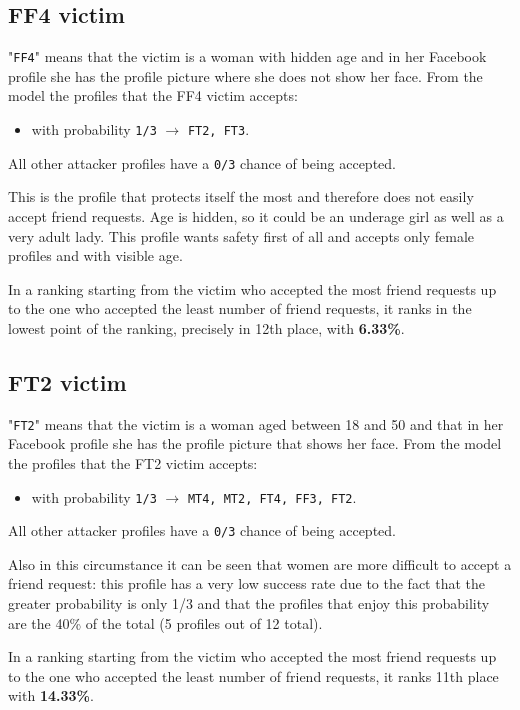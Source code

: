 \subsection*{FF4 victim}
"\texttt{FF4}" means that the victim is a woman with hidden age and in her Facebook profile she has the profile picture where she does not show her face.
From the model the profiles that the FF4 victim accepts:
\begin{itemize}
	\item with probability \texttt{1/3} $\rightarrow$ \texttt{FT2, FT3}.
\end{itemize}  
All other attacker profiles have a \texttt{0/3} chance of being accepted.
\par \noindent This is the profile that protects itself the most and therefore does not easily accept friend requests. Age is hidden, so it could be an underage girl as well as a very adult lady. This profile wants safety first of all and accepts only female profiles and with visible age.
\par \noindent In a ranking starting from the victim who accepted the most friend requests up to the one who accepted the least number of friend requests, it ranks in the lowest point of the ranking, precisely in 12th place, with \textbf{6.33\%}.


\subsection*{FT2 victim}
"\texttt{FT2}" means that the victim is a woman aged between 18 and 50 and that in her Facebook profile she has the profile picture that shows her face.
From the model the profiles that the FT2 victim accepts:
\begin{itemize}
	\item with probability \texttt{1/3} $\rightarrow$ \texttt{MT4, MT2, FT4, FF3, FT2}.
\end{itemize}  
All other attacker profiles have a \texttt{0/3} chance of being accepted.
\par \noindent Also in this circumstance it can be seen that women are more difficult to accept a friend request: this profile has a very low success rate due to the fact that the greater probability is only 1/3 and that the profiles that enjoy this probability are the 40\% of the total (5 profiles out of 12 total).
\par \noindent In a ranking starting from the victim who accepted the most friend requests up to the one who accepted the least number of friend requests, it ranks 11th place with \textbf{14.33\%}.


